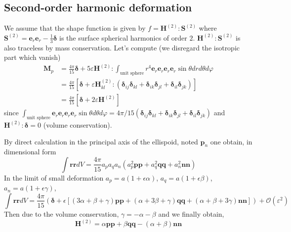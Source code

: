 \documentclass[12pt]{My_preprint}
\begin{document}
\subsection{Second-order harmonic deformation}
We assume that the shape function is given by $f = \textbf{H}^{(2)}:\textbf{S}^{(2)}$ where $\textbf{S}^{(2)} = \textbf{e}_r\textbf{e}_r - \frac{1}{3}\bm\delta$ is the surface spherical harmonics of order $2$.
$\textbf{H}^{(2)}:\textbf{S}^{(2)}$ is also traceless by mass conservation.
Let's compute (we disregard the isotropic part which vanish)
\begin{align}
  \textbf{M}_p
  &=
  \frac{4\pi}{15}\bm\delta+
  5 \varepsilon \textbf{H}^{(2)}: \int_{\text{unit sphere}}{r^4 \textbf{e}_r \textbf{e}_r \textbf{e}_r \textbf{e}_r }\sin\theta dr d\theta d\varphi\\
  &=
  \frac{4\pi}{15}[\bm\delta+
  \varepsilon \textbf{H}^{(2)}_{kl}: (
      \bm\delta_{ij}
      \bm\delta_{kl}
      +\bm\delta_{ik}
      \bm\delta_{jl}
      +\bm\delta_{il}
      \bm\delta_{jk}
  )
  ]\\
  &=
  \frac{4\pi}{15}[\bm\delta+
  2 \varepsilon \textbf{H}^{(2)}
  ]
\end{align}
since $\int_{\text{unit sphere}} \textbf{e}_r \textbf{e}_r \textbf{e}_r \textbf{e}_r\sin\theta  d\theta d\varphi = 4\pi/15 (
  \bm\delta_{ij}
  \bm\delta_{kl}
  +\bm\delta_{ik}
  \bm\delta_{jl}
  +\bm\delta_{il}
  \bm\delta_{jk}
)$ and $\textbf{H}^{(2)}:\bm \delta =0$ (volume conservation).

By direct calculation in the principal axis of the ellispoid, noted $\textbf{p}_n$ one obtain, in dimensional form
\begin{equation}
    \int \textbf{rr} dV =  \frac{4\pi}{15}a_pa_qa_n (a_p^2 \textbf{p} \textbf{p}+ a_q^2\textbf{q} \textbf{q} + a_n^2\textbf{n} \textbf{n})
\end{equation}
In the limit of small deformation $a_p = a (1+\epsilon \alpha)$, $a_q = a (1+\epsilon \beta)$, $a_n = a (1+\epsilon \gamma)$,
\begin{equation}
  \int \textbf{rr} dV =  \frac{4\pi}{15} (\bm \delta + \epsilon \left[(3\alpha +\beta +\gamma) \textbf{p} \textbf{p}+ (\alpha +3\beta +\gamma)\textbf{q} \textbf{q} + (\alpha +\beta +3\gamma)\textbf{n} \textbf{n}\right]) + \mathcal{O}(\varepsilon^2)
\end{equation}
Then due to the volume conservation, $\gamma = -\alpha -\beta$ and we finally obtain,
\begin{equation}
\textbf{H}^{(2)} = \alpha \textbf{p} \textbf{p} + \beta \textbf{q} \textbf{q} - (\alpha + \beta) \textbf{n} \textbf{n} 
\end{equation}
\end{document}
